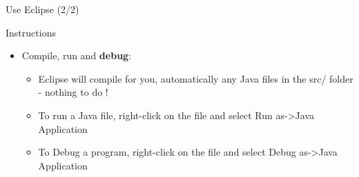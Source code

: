 {  \begin{frame}{Use Eclipse (2/2)}
    \begin{block}{Instructions}
      \begin{itemize}
        \item Compile, run and \textbf{debug}:
        \begin{itemize}
          \item Eclipse will compile for you, automatically any Java files in the src/ folder -
          nothing to do !
          \item To run a Java file, right-click on the file and select Run as->Java Application
          \item To Debug a program, right-click on the file and select Debug as->Java Application
        \end{itemize}
      \end{itemize}
    \end{block}
  \end{frame}
}

